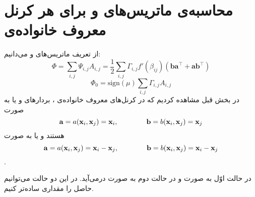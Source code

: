 \section{محاسبه‌ی ماتریس‌های
\lr{$\Phi$}
\label{PhiZero}
و
برای هر کرنل معروف خانواده‌ی
}
از تعریف ماتریس‌های
\lr{$\Phi$}
و
می‌دانیم:
\begin{equation}
\Phi = \sum_{i, j}\Psi_{i,j}A_{i,j} = \frac{1}{2}\sum_{i, j} \Gamma_{i, j} f'(\beta_{ij})(\mathbf{ba}^\top +\mathbf{ab}^\top)
\end{equation}
\begin{equation}
\Phi_0 = \text{sign}(\mu) \sum_{i, j} \Gamma_{i, j} A_{i,j}
\end{equation}
در بخش قبل مشاهده کردیم که در کرنل‌های معروف خانواده‌ی
،
بردارهای
و
یا به صورت
\[\mathbf{a} = a(\mathbf{x}_i,\mathbf{x}_j)=\mathbf{x}_i,\qquad\qquad\mathbf{b} = b(\mathbf{x}_i,\mathbf{x}_j)=\mathbf{x}_j\]
هستند و یا به صورت
\[\mathbf{a} = a(\mathbf{x}_i,\mathbf{x}_j)=\mathbf{x}_i-\mathbf{x}_j,\qquad\qquad\mathbf{b} = b(\mathbf{x}_i,\mathbf{x}_j)=\mathbf{x}_i-\mathbf{x}_j\].

در حالت اوّل به صورت
و در حالت دوم به صورت
درمی‌آید.
در این دو حالت می‌توانیم حاصل
را مقداری ساده‌تر کنیم.


